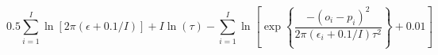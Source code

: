 



\begin{equation}
	0.5 \sum_{i=1}^I \ln \left[2 \pi (\epsilon + 0.1/I)  \right]
	+ I  \ln(\tau)
	-\sum_{i=1}^I \ln \left[\exp\left\{ \frac{-(o_i-p_i)^2}
	{2 \pi (\epsilon_i + 0.1/I) \tau^2}\right\}+0.01 \right]
\end{equation}







